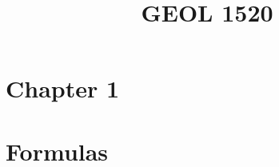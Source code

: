\documentclass[12pt,a4paper]{article}
\title{GEOL 1520}
\date{}
\begin{document}
\maketitle

\tableofcontents

\section{Chapter 1}





\section{Formulas}

\end{document}
